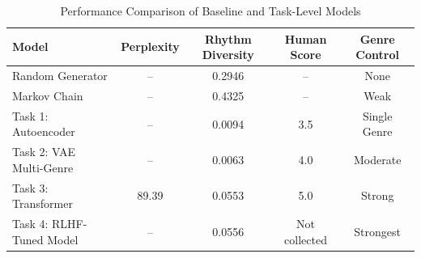 \begin{table}[!htb]
\caption{Performance Comparison of Baseline and Task-Level Models}
\label{tab:performance_comparison}
\centering
\begin{tabular}{lcccc}
\hline
\textbf{Model} & \textbf{Perplexity} & \textbf{Rhythm Diversity} & \textbf{Human Score} & \textbf{Genre Control} \\
\hline
Random Generator & -- & 0.2946 & -- & None \\
Markov Chain & -- & 0.4325 & -- & Weak \\
Task 1: Autoencoder & -- & 0.0094 & 3.5 & Single Genre \\
Task 2: VAE Multi-Genre & -- & 0.0063 & 4.0 & Moderate \\
Task 3: Transformer & 89.39 & 0.0553 & 5.0 & Strong \\
Task 4: RLHF-Tuned Model & -- & 0.0556 & Not collected & Strongest \\
\hline
\end{tabular}
\end{table}
